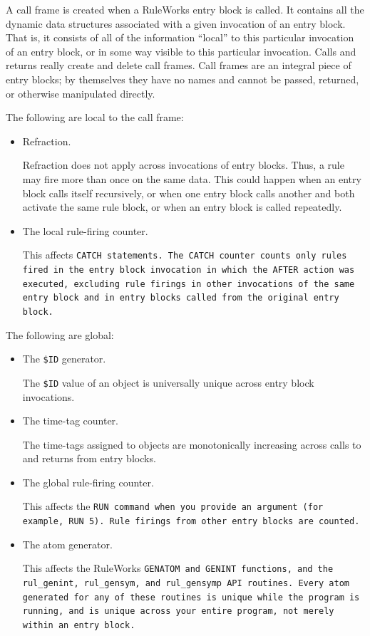 A call frame is created when a RuleWorks entry block is called. It
contains all the dynamic data structures associated with a given
invocation of an entry block. That is, it consists of all of the
information ``local'' to this particular invocation of an entry block,
or in some way visible to this particular invocation. Calls and
returns really create and delete call frames. Call frames are an
integral piece of entry blocks; by themselves they have no names and
cannot be passed, returned, or otherwise manipulated directly.

The following are local to the call frame:
\begin{itemize}
\item Refraction.

  Refraction does not apply across invocations of entry blocks. Thus,
  a rule may fire more than once on the same data.  This could happen
  when an entry block calls itself recursively, or when one entry
  block calls another and both activate the same rule block, or when
  an entry block is called repeatedly.

\item The local rule-firing counter.

  This affects \tt{CATCH} statements. The \tt{CATCH} counter counts
  only rules fired in the entry block invocation in which the
  \tt{AFTER} action was executed, excluding rule firings in other
  invocations of the same entry block and in entry blocks called from
  the original entry block.
\end{itemize}

The following are global:
\begin{itemize}
\item The \verb|$ID| generator.

  The \verb|$ID| value of an object is universally unique across entry
  block invocations.

\item The time-tag counter.

  The time-tags assigned to objects are monotonically increasing
  across calls to and returns from entry blocks.

\item The global rule-firing counter.

  This affects the \tt{RUN} command when you provide an argument (for
  example, \tt{RUN} 5).  Rule firings from other entry blocks are
  counted.

\item The atom generator.

  This affects the RuleWorks \tt{GENATOM} and \tt{GENINT} functions,
  and the \verb|rul_genint|, \verb|rul_gensym|, and \verb|rul_gensymp|
  API routines.  Every atom generated for any of these routines is
  unique while the program is running, and is unique across your
  entire program, not merely within an entry block.
\end{itemize}

